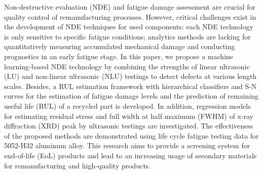 Non-destructive evaluation (NDE) and fatigue damage assessment are crucial for quality control of remanufacturing processes. However, critical challenges exist in the development of NDE techniques for used components: each NDE technology is only sensitive to specific fatigue conditions; analytics methods are lacking for quantitatively measuring accumulated mechanical damage and conducting prognostics in an early fatigue stage. In this paper, we propose a machine learning-based NDE technology by combining the strengths of linear ultrasonic (LU) and non-linear ultrasonic (NLU) testings to detect defects at various length scales. Besides, a RUL estimation framework with hierarchical classifiers and S-N curves for the estimation of fatigue damage levels and the prediction of remaining useful life (RUL) of a recycled part is developed. In addition, regression models for estimating residual stress and full width at half maximum (FWHM) of x-ray diffraction (XRD) peak by ultrasonic testings are investigated. The effectiveness of the proposed methods are demonstrated using life cycle fatigue testing data for 5052-H32 aluminum alloy. This research aims to provide a screening system for end-of-life (EoL) products and lead to an increasing usage of secondary materials for remanufacturing and high‐quality products.